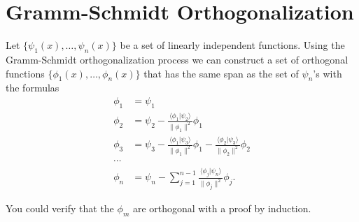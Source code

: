 








\section{Gramm-Schmidt Orthogonalization}

Let $\{\psi_1(x), \ldots, \psi_n(x)\}$ be a set of linearly independent 
functions.  Using the Gramm-Schmidt orthogonalization process we can
construct a set of orthogonal functions $\{\phi_1(x), \ldots, \phi_n(x)\}$
that has the same span as the set of $\psi_n$'s with the formulas
\begin{align*}
  \phi_1 &= \psi_1 \\
  \phi_2 &= \psi_2 - \frac{\langle \phi_1 | \psi_2 \rangle}{\|\phi_1\|^2} \phi_1\\
  \phi_3 &= \psi_3 - \frac{\langle \phi_1 | \psi_3 \rangle}{\|\phi_1\|^2} \phi_1 
  - \frac{\langle \phi_2 | \psi_3 \rangle}{\|\phi_2\|^2} \phi_2\\
  \cdots & \\
  \phi_n &= \psi_n - \sum_{j=1}^{n-1} \frac{\langle \phi_j | \psi_n \rangle}
  {\|\phi_j\|^2} \phi_j.
\end{align*}

You could verify that the $\phi_m$ are orthogonal with a proof by induction.





